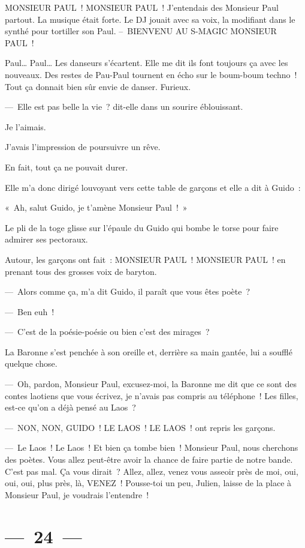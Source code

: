 \documentclass[twoside]{book} %
\begin{document}
\noindent MONSIEUR PAUL ! MONSIEUR PAUL ! J’entendais des Monsieur Paul partout. La musique était forte. Le DJ jouait avec sa voix, la modifiant dans le synthé pour tortiller son Paul. – BIENVENU AU S-MAGIC MONSIEUR PAUL !\par
Paul… Paul… Les danseurs s’écartent. Elle me dit ils font toujours ça avec les nouveaux. Des restes de Pau-Paul tournent en écho sur le boum-boum techno ! Tout ça donnait bien sûr envie de danser. Furieux.\par
— Elle est pas belle la vie ? dit-elle dans un sourire éblouissant.\par
Je l’aimais.\par
J’avais l’impression de poursuivre un rêve.\par
En fait, tout ça ne pouvait durer.\par
Elle m’a donc dirigé louvoyant vers cette table de garçons et elle a dit à Guido :\par
« Ah, salut Guido, je t’amène Monsieur Paul ! »\par
Le pli de la toge glisse sur l’épaule du Guido qui bombe le torse pour faire admirer ses pectoraux.\par
Autour, les garçons ont fait : MONSIEUR PAUL ! MONSIEUR PAUL ! en prenant tous des grosses voix de baryton.\par
— Alors comme ça, m’a dit Guido, il paraît que vous êtes poète ?\par
— Ben euh !\par
— C’est de la poésie-poésie ou bien c’est des mirages ?\par
La Baronne s’est penchée à son oreille et, derrière sa main gantée, lui a soufflé quelque chose.\par
— Oh, pardon, Monsieur Paul, excusez-moi, la Baronne me dit que ce sont des contes laotiens que vous écrivez, je n’avais pas compris au téléphone ! Les filles, est-ce qu’on a déjà pensé au Laos ?\par
— NON, NON, GUIDO ! LE LAOS ! LE LAOS ! ont repris les garçons.\par
— Le Laos ! Le Laos ! Et bien ça tombe bien ! Monsieur Paul, nous cherchons des poètes. Vous allez peut-être avoir la chance de faire partie de notre bande. C’est pas mal. Ça vous dirait ? Allez, allez, venez vous asseoir près de moi, oui, oui, oui, plus près, là, VENEZ ! Pousse-toi un peu, Julien, laisse de la place à Monsieur Paul, je voudrais l’entendre !

\section[{— 24 —}]{— 24 —}
\renewcommand{\leftmark}{— 24 —}
\end{document}

